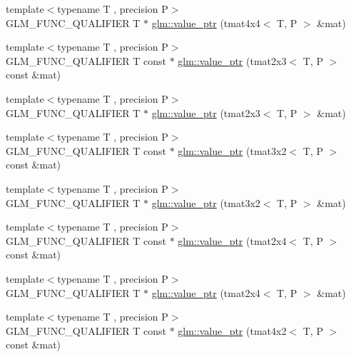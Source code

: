 \begin{DoxyCompactItemize}
\item 
{\footnotesize template$<$typename T , precision P$>$ }\\G\-L\-M\-\_\-\-F\-U\-N\-C\-\_\-\-Q\-U\-A\-L\-I\-F\-I\-E\-R T $\ast$ \hyperlink{group__gtc__type__ptr_ga1fc49ab60e5afdd4821a6903e92244a4}{glm\-::value\-\_\-ptr} (tmat4x4$<$ T, P $>$ \&mat)
\item 
{\footnotesize template$<$typename T , precision P$>$ }\\G\-L\-M\-\_\-\-F\-U\-N\-C\-\_\-\-Q\-U\-A\-L\-I\-F\-I\-E\-R T const $\ast$ \hyperlink{group__gtc__type__ptr_ga968f2c8899914ea1c1daaaded8daa6b5}{glm\-::value\-\_\-ptr} (tmat2x3$<$ T, P $>$ const \&mat)
\item 
{\footnotesize template$<$typename T , precision P$>$ }\\G\-L\-M\-\_\-\-F\-U\-N\-C\-\_\-\-Q\-U\-A\-L\-I\-F\-I\-E\-R T $\ast$ \hyperlink{group__gtc__type__ptr_ga36fb9a17664c8b6848a5d005e4068a2f}{glm\-::value\-\_\-ptr} (tmat2x3$<$ T, P $>$ \&mat)
\item 
{\footnotesize template$<$typename T , precision P$>$ }\\G\-L\-M\-\_\-\-F\-U\-N\-C\-\_\-\-Q\-U\-A\-L\-I\-F\-I\-E\-R T const $\ast$ \hyperlink{group__gtc__type__ptr_ga398202d6ce304deb7da50badde85ee41}{glm\-::value\-\_\-ptr} (tmat3x2$<$ T, P $>$ const \&mat)
\item 
{\footnotesize template$<$typename T , precision P$>$ }\\G\-L\-M\-\_\-\-F\-U\-N\-C\-\_\-\-Q\-U\-A\-L\-I\-F\-I\-E\-R T $\ast$ \hyperlink{group__gtc__type__ptr_gad6a737f57febdef255873f6a44d0db0e}{glm\-::value\-\_\-ptr} (tmat3x2$<$ T, P $>$ \&mat)
\item 
{\footnotesize template$<$typename T , precision P$>$ }\\G\-L\-M\-\_\-\-F\-U\-N\-C\-\_\-\-Q\-U\-A\-L\-I\-F\-I\-E\-R T const $\ast$ \hyperlink{group__gtc__type__ptr_ga2336cd68e72b0d295c8cd33eb1588480}{glm\-::value\-\_\-ptr} (tmat2x4$<$ T, P $>$ const \&mat)
\item 
{\footnotesize template$<$typename T , precision P$>$ }\\G\-L\-M\-\_\-\-F\-U\-N\-C\-\_\-\-Q\-U\-A\-L\-I\-F\-I\-E\-R T $\ast$ \hyperlink{group__gtc__type__ptr_ga0d745a55255710933effd6391307f681}{glm\-::value\-\_\-ptr} (tmat2x4$<$ T, P $>$ \&mat)
\item 
{\footnotesize template$<$typename T , precision P$>$ }\\G\-L\-M\-\_\-\-F\-U\-N\-C\-\_\-\-Q\-U\-A\-L\-I\-F\-I\-E\-R T const $\ast$ \hyperlink{group__gtc__type__ptr_ga1de002422f32c6da9d65d3f257f37196}{glm\-::value\-\_\-ptr} (tmat4x2$<$ T, P $>$ const \&mat)

\end{DoxyCompactItemize}
